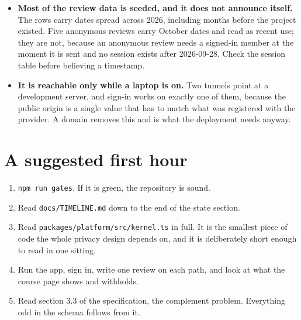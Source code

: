 \documentclass[11pt,a4paper]{article}
\begin{document}
\begin{itemize}[leftmargin=*]
        preventing. The figures live in the database, where somebody entitled
        to see them can look.
  \item \textbf{Most of the review data is seeded, and it does not announce
        itself.} The rows carry dates spread across 2026, including months
        before the project existed. Five anonymous reviews carry October dates
        and read as recent use; they are not, because an anonymous review needs
        a signed-in member at the moment it is sent and no session exists after
        2026-09-28. Check the session table before believing a timestamp.
  \item \textbf{It is reachable only while a laptop is on.} Two tunnels point
        at a development server, and sign-in works on exactly one of them,
        because the public origin is a single value that has to match what was
        registered with the provider. A domain removes this and is what the
        deployment needs anyway.
\end{itemize}

\section{A suggested first hour}

\begin{enumerate}[leftmargin=*]
  \item \texttt{npm run gates}. If it is green, the repository is sound.
  \item Read \texttt{docs/TIMELINE.md} down to the end of the state section.
  \item Read \texttt{packages/platform/src/kernel.ts} in full. It is the
        smallest piece of code the whole privacy design depends on, and it is
        deliberately short enough to read in one sitting.
  \item Run the app, sign in, write one review on each path, and look at what
        the course page shows and withholds.
  \item Read section 3.3 of the specification, the complement problem.
        Everything odd in the schema follows from it.
\end{enumerate}
\end{document}
